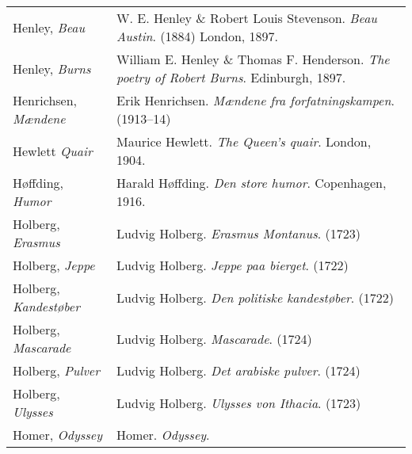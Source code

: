 \begin{longtable}{p{} p{}}
Henley, \textit{Beau} & W. E. Henley \& Robert Louis Stevenson. \textit{Beau Austin}. (1884) London, 1897. \\
Henley, \textit{Burns} & William E. Henley \& Thomas F. Henderson. \textit{The poetry of Robert Burns}. Edinburgh, 1897. \\

Henrichsen, \textit{Mændene} & Erik Henrichsen. \textit{Mændene fra forfatningskampen}. (1913--14) \\

Hewlett \textit{Quair} & Maurice Hewlett. \textit{The Queen's quair}. London, 1904. \\

Høffding, \textit{Humor} & Harald Høffding. \textit{Den store humor}. Copenhagen, 1916. \\

Holberg, \textit{Erasmus} & Ludvig Holberg. \textit{Erasmus Montanus}. (1723) \\ %
Holberg, \textit{Jeppe} & Ludvig Holberg. \textit{Jeppe paa bierget}. (1722) \\
Holberg, \textit{Kandestøber} & Ludvig Holberg. \textit{Den politiske kandestøber}. (1722) \\
Holberg, \textit{Mascarade} & Ludvig Holberg. \textit{Mascarade}. (1724) \\
Holberg, \textit{Pulver} & Ludvig Holberg. \textit{Det arabiske pulver}. (1724) \\
Holberg, \textit{Ulysses} & Ludvig Holberg. \textit{Ulysses von Ithacia}. (1723) \\
%

Homer, \textit{Odyssey} & Homer. \textit{Odyssey}.  \\ %


\end{longtable}
